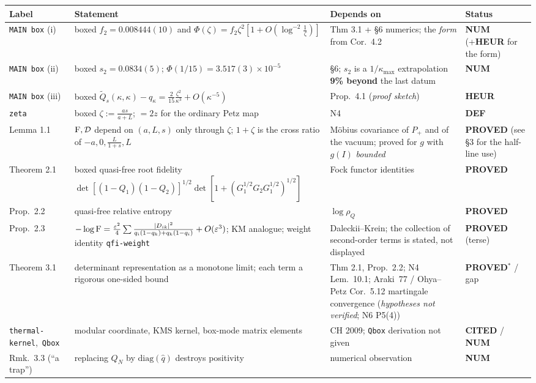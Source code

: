 \documentclass[11pt]{article}
\newcommand{\stPR}{{\color{okgreen}\textsf{\scriptsize\bfseries PROVED}}}
\newcommand{\stPMC}{{\color{teal}\textsf{\scriptsize\bfseries PROVED$^\ast$}}}
\newcommand{\stCIT}{{\color{navy}\textsf{\scriptsize\bfseries CITED}}}
\newcommand{\stNUM}{{\color{orange!80!black}\textsf{\scriptsize\bfseries NUM}}}
\newcommand{\stHEU}{{\color{warn}\textsf{\scriptsize\bfseries HEUR}}}
\newcommand{\stDEF}{{\textsf{\scriptsize\bfseries DEF}}}
\newcommand{\NIV}{N4}\newcommand{\NV}{N5}\newcommand{\NVI}{N6}\newcommand{\NVII}{N7}
\newcommand{\zz}{\zeta}
\begin{document}
{\footnotesize\setlength{\emergencystretch}{4em}\sloppy{}\relax{}\relax
\begin{tabularx}{\textwidth}{L{0.155\textwidth} X L{0.210\textwidth} L{0.098\textwidth}}
\toprule
\textbf{Label} & \textbf{Statement} & \textbf{Depends on} & \textbf{Status}\\
\midrule\endhead
\texttt{MAIN box} (i) & boxed $f_2=0.008444(10)$ and $\Phi(\zz)=f_2\zz^2[1+O(\log^{-2}\frac1\zz)]$ & Thm 3.1 + \S6 numerics; the \emph{form} from Cor.~4.2 & \stNUM{} (+\stHEU{} for the form) \\
\texttt{MAIN box} (ii) & boxed $s_2=0.0834(5)$; $\Phi(1/15)=3.517(3)\!\times\!10^{-5}$ & \S6; $s_2$ is a $1/\kappa_{\max}$ extrapolation \textbf{9\% beyond} the last datum & \stNUM \\
\texttt{MAIN box} (iii) & boxed $\widetilde Q_s(\kappa,\kappa)-q_\kappa=\frac2{15}\frac{\zz^2}{\kappa^3}+O(\kappa^{-5})$ & Prop.~4.1 (\emph{proof sketch}) & \stHEU \\
\texttt{zeta} & boxed $\zz:=\frac{as}{a+L}$; $=2z$ for the ordinary Petz map & \NIV & \stDEF \\
Lemma 1.1 & $\operatorname{F},\mathcal D$ depend on $(a,L,s)$ only through $\zz$; $1+\zz$ is the cross ratio of $-a,0,\frac L{1+s},L$ & M\"obius covariance of $P_+$ and of the vacuum; proved for $g$ with $g(I)$ \emph{bounded} & \stPR{} (see \S3 for the half-line use) \\
Theorem 2.1 & boxed quasi-free root fidelity $\det[(1{-}Q_1)(1{-}Q_2)]^{1/2}\det[1+(G_1^{1/2}G_2G_1^{1/2})^{1/2}]$ & Fock functor identities & \stPR \\
Prop.~2.2 & quasi-free relative entropy & $\log\rho_Q$ & \stPR \\
Prop.~2.3 & $-\log\operatorname{F}=\frac{\varepsilon^2}4\sum\frac{|D_{ik}|^2}{q_i(1{-}q_k)+q_k(1{-}q_i)}+O(\varepsilon^3)$; KM analogue; weight identity \texttt{qfi-weight} & Daleckii--Krein; the collection of second-order terms is stated, not displayed & \stPR{} (terse) \\
Theorem 3.1 & determinant representation as a monotone limit; each term a rigorous one-sided bound & Thm 2.1, Prop.~2.2; \NIV{} Lem.~10.1; Araki~77 / Ohya--Petz Cor.~5.12 martingale convergence (\emph{hypotheses not verified}; \NVI{} P5(4)) & \stPMC{} / gap \\
\texttt{thermal-\allowbreak kernel},\allowbreak\ \texttt{Qbox} & modular coordinate, KMS kernel, box-mode matrix elements & CH 2009; \texttt{Qbox} derivation not given & \stCIT{} / \stNUM \\
Rmk.~3.3 (``a trap'') & replacing $Q_N$ by $\mathrm{diag}(\widehat q)$ destroys positivity & numerical observation & \stNUM \\

\end{tabularx}}
\end{document}
